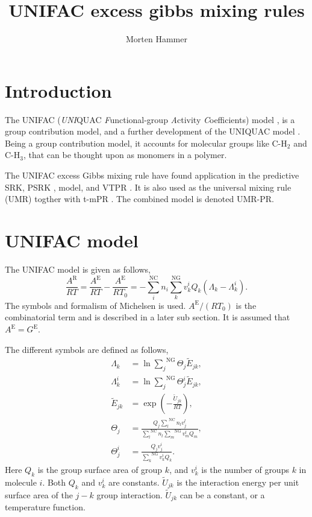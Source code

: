 \documentclass[english]{../thermomemo/thermomemo}
\title{UNIFAC excess gibbs mixing rules}
\author{Morten Hammer}
\newcommand*{\ousum}[2]{\overset{#1}{\underset{#2}{\sum}}}
\newcommand{\excess}{\text{E}\xspace}
\newcommand{\NC}{\text{NC}\xspace}
\newcommand{\NGr}{\text{NG}\xspace}
\newcommand{\res}{\text{R}\xspace}
\begin{document}
\frontmatter
\tableofcontents
\section{Introduction}
The UNIFAC (\textit{UNI}QUAC \textit{F}unctional-group \textit{A}ctivity
\textit{C}oefficients) model \cite{Fredenslund1975}, is a group
contribution model, and a further development of the UNIQUAC model
\cite{Abrams1975}. Being a group contribution model, it accounts for
molecular groups like $\text{C-H}_2$ and $\text{C-H}_3$,
that can be thought upon as monomers in a polymer.

The UNIFAC excess Gibbs mixing rule have found application in the
predictive SRK, PSRK \cite{Holderbaum1991}, model, and VTPR
\cite{Collinet2006}. It is also used as the universal mixing rule
(UMR) \cite{Voutsas2004} togther with t-mPR
\cite{Magoulas1990,Avlonitis1994}. The combined model is denoted
UMR-PR.

\section{UNIFAC model}
The UNIFAC model \cite{Fredenslund1975} is given as follows,
\begin{equation}
  \frac{A^\res}{RT} = \frac{A^\excess}{RT} - \frac{A^\excess}{RT_0} = - \ousum{\NC}{i} n_i \ousum{\NGr}{k}  v_k^i Q_k(\Lambda_k - \Lambda_k^i).
  \label{eq:Ae}
\end{equation}
The symbols and formalism of Michelsen \cite{Michelsen2007} is
used. $A^\excess/(RT_0)$ is the combinatorial term and is described in
a later sub section. It is assumed that $A^\excess = G^\excess$.

The different symbols are defined as follows,
\begin{align}
  \Lambda_k &= \ln \ousum{\NGr}{j}  \Theta_j \tilde{E}_{jk},\label{eq:Lambda_k}\\
  \Lambda_k^i &= \ln \ousum{\NGr}{j}  \Theta_j^i \tilde{E}_{jk}, \label{eq:Lambda_ki}\\
  \tilde{E}_{jk} &= \exp \left(-\frac{\tilde{U}_{jk}}{RT}\right), \label{eq:E_jk}\\
  \Theta_j &= \frac{Q_j \ousum{\NC}{l}n_lv_j^l}{\ousum{\NC}{l}n_l\ousum{\NGr}{m}v_m^lQ_m}, \label{eq:Theta_j}\\
  \Theta_j^i &= \frac{Q_j v_j^i}{\ousum{\NGr}{k}v_k^iQ_k}. \label{eq:Theta_ji}
\end{align}
Here $Q_k$ is the group surface area of group $k$, and $v_k^i$ is the
number of groups $k$ in molecule $i$. Both $Q_k$ and $v_k^i$ are
constants. $\tilde{U}_{jk}$ is the interaction energy per unit surface
area of the $j-k$ group interaction. $\tilde{U}_{jk}$ can be a
constant, or a temperature function.
\end{document}
